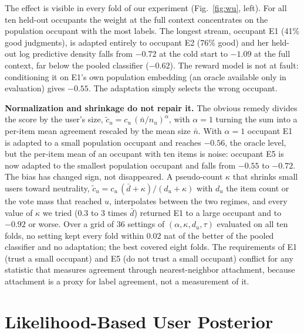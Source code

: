 \documentclass[conference]{IEEEtran}
\begin{document}
The effect is visible in every fold of our experiment (Fig.~\ref{fig:wu}, left). For all ten held-out occupants the weight at the full context concentrates on the population occupant with the most labels. The longest stream, occupant E1 (41\% good judgments), is adapted entirely to occupant E2 (76\% good) and her held-out log predictive density falls from $-0.72$ at the cold start to $-1.09$ at the full context, far below the pooled classifier ($-0.62$). The reward model is not at fault: conditioning it on E1's own population embedding (an oracle available only in evaluation) gives $-0.55$. The adaptation simply selects the wrong occupant.

\textbf{Normalization and shrinkage do not repair it.} The obvious remedy divides the score by the user's size, $\tilde c_u=c_u\,(\bar n/n_u)^{\alpha}$, with $\alpha=1$ turning the sum into a per-item mean agreement rescaled by the mean size $\bar n$. With $\alpha=1$ occupant E1 is adapted to a small population occupant and reaches $-0.56$, the oracle level, but the per-item mean of an occupant with ten items is noise: occupant E5 is now adapted to the smallest population occupant and falls from $-0.55$ to $-0.72$. The bias has changed sign, not disappeared. A pseudo-count $\kappa$ that shrinks small users toward neutrality, $\tilde c_u=c_u\,(\bar d+\kappa)/(d_u+\kappa)$ with $d_u$ the item count or the vote mass that reached $u$, interpolates between the two regimes, and every value of $\kappa$ we tried ($0.3$ to $3$ times $\bar d$) returned E1 to a large occupant and to $-0.92$ or worse. Over a grid of $36$ settings of $(\alpha,\kappa,d_u,\tau)$ evaluated on all ten folds, no setting kept every fold within $0.02$ nat of the better of the pooled classifier and no adaptation; the best covered eight folds. The requirements of E1 (trust a small occupant) and E5 (do not trust a small occupant) conflict for any statistic that measures agreement through nearest-neighbor attachment, because attachment is a proxy for label agreement, not a measurement of it.

\section{Likelihood-Based User Posterior}
\label{sec:posterior}
\end{document}
